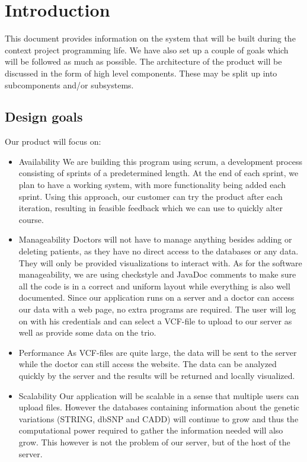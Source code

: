 \section{Introduction}
	This document provides information on the system that will be built during the context project programming life. We have also set up a couple of goals which will be followed as much as possible. The architecture of the product will be discussed in the form of high level components. These may be split up into subcomponents and/or subsystems.
	\subsection{Design goals}
	Our product will focus on:
	\begin{itemize}
		\item Availability
			\subitem We are building this program using scrum, a development process consisting of sprints of a predetermined length. At the end of each sprint, we plan to have a working system, with more functionality being added each sprint. Using this approach, our customer can try the product after each iteration, resulting in feasible feedback which we can use to quickly alter course.
		\item Manageability
			\subitem Doctors will not have to manage anything besides adding or deleting patients, as they have no direct access to the databases or any data. They will only be provided visualizations to interact with. 
			\subitem As for the software manageability, we are using checkstyle and JavaDoc comments to make sure all the code is in a correct and uniform layout while everything is also well documented.
			\subitem Since our application runs on a server and a doctor can access our data with a web page, no extra programs are required. The user will log on with his credentials and can select a VCF-file to upload to our server as well as provide some data on the trio.
		\item Performance
			\subitem As VCF-files are quite large, the data will be sent to the server while the doctor can still access the website. The data can be analyzed quickly by the server and the results will be returned and locally visualized.
		\item Scalability
			\subitem Our application will be scalable in a sense that multiple users can upload files. However the databases containing information about the genetic variations (STRING, dbSNP and CADD) will continue to grow and thus the computational power required to gather the information needed will also grow. This however is not the problem of our server, but of the host of the server.

\end{itemize}
